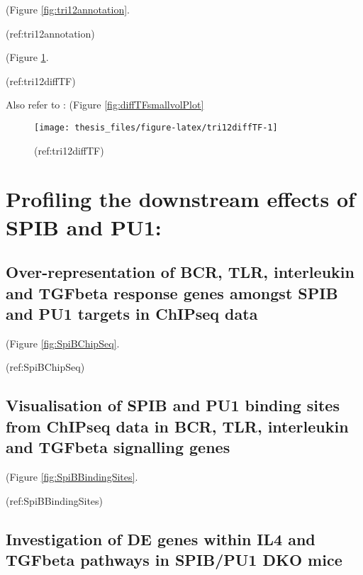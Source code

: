 \documentclass[11pt, a4paper, twosided]{book}
\begin{document}
(Figure \ref{fig:tri12annotation}.

(ref:tri12annotation)

(Figure \ref{fig:tri12diffTF}.

(ref:tri12diffTF)

Also refer to : (Figure \ref{fig:diffTFsmallvolPlot}
\begin{figure}

{\centering \texttt{[image: thesis\_files/figure-latex/tri12diffTF-1]} 

}

\caption{(ref:tri12diffTF)}\label{fig:tri12diffTF}
\end{figure}
\hypertarget{profiling-the-downstream-effects-of-spib-and-pu1}{%
\section{Profiling the downstream effects of SPIB and PU1:}\label{profiling-the-downstream-effects-of-spib-and-pu1}}

\hypertarget{over-representation-of-bcr-tlr-interleukin-and-tgfbeta-response-genes-amongst-spib-and-pu1-targets-in-chipseq-data}{%
\subsection{Over-representation of BCR, TLR, interleukin and TGFbeta response genes amongst SPIB and PU1 targets in ChIPseq data}\label{over-representation-of-bcr-tlr-interleukin-and-tgfbeta-response-genes-amongst-spib-and-pu1-targets-in-chipseq-data}}

(Figure \ref{fig:SpiBChipSeq}.

(ref:SpiBChipSeq)

\hypertarget{visualisation-of-spib-and-pu1-binding-sites-from-chipseq-data-in-bcr-tlr-interleukin-and-tgfbeta-signalling-genes}{%
\subsection{Visualisation of SPIB and PU1 binding sites from ChIPseq data in BCR, TLR, interleukin and TGFbeta signalling genes}\label{visualisation-of-spib-and-pu1-binding-sites-from-chipseq-data-in-bcr-tlr-interleukin-and-tgfbeta-signalling-genes}}

(Figure \ref{fig:SpiBBindingSites}.

(ref:SpiBBindingSites)

\hypertarget{investigation-of-de-genes-within-il4-and-tgfbeta-pathways-in-spibpu1-dko-mice}{%
\subsection{Investigation of DE genes within IL4 and TGFbeta pathways in SPIB/PU1 DKO mice}\label{investigation-of-de-genes-within-il4-and-tgfbeta-pathways-in-spibpu1-dko-mice}}
\end{document}
